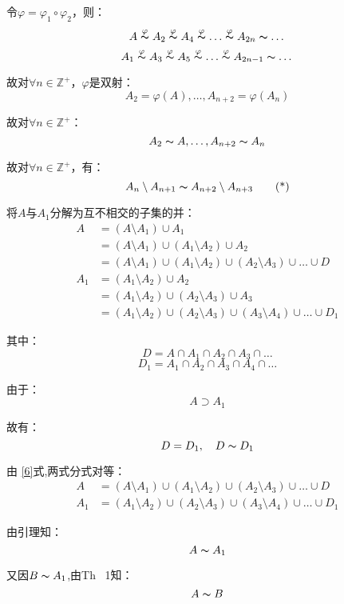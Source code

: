 \par 令$\varphi =\varphi _{1}\circ \varphi _{2}$，则：
$$A \stackrel{\varphi}{\thicksim }A_{2}\stackrel{\varphi}{\thicksim }A_{4}\stackrel{\varphi}{\thicksim } \dots \stackrel{\varphi}{\thicksim}A_{2n} \thicksim \dots$$
$$A_{1} \stackrel{\varphi}{\thicksim }A_{3}\stackrel{\varphi}{\thicksim }A_{5}\stackrel{\varphi}{\thicksim } \dots \stackrel{\varphi}{\thicksim}A_{2n-1} \thicksim \dots$$
\par 故对$\forall n \in \mathbb{Z}^{+}$，$\varphi $是双射：
$$A_{2} = \varphi (A),\dots,A_{n+2} = \varphi (A_{n})$$
\par 故对$\forall n \in \mathbb{Z}^{+}$：
$$A_{2}\thicksim A,\dots,A_{n+2}\thicksim A_{n}$$
\par 故对$\forall n \in \mathbb{Z}^{+}$，有：
\begin{equation}
   A_{n}\setminus A_{n+1}\thicksim A_{n+2}\setminus A_{n+3} \tag{*} \label{6}
\end{equation}
\par 将$A$与$A_{1}$分解为互不相交的子集的并：
\begin{align*}
    A & = \left(A\setminus A_{1}\right) \cup A_{1} \\
    & = \left(A\setminus A_{1}\right) \cup \left(A_{1}\setminus A_{2}\right) \cup A_{2}\\
    & = \left(A\setminus A_{1}\right) \cup \left(A_{1}\setminus A_{2}\right) \cup \left(A_{2}\setminus A_{3}\right) \cup \dots \cup D\\
    A_{1} & = \left(A_{1}\setminus A_{2}\right) \cup A_{2} \\
    & = \left(A_{1}\setminus A_{2}\right) \cup \left(A_{2}\setminus A_{3}\right) \cup A_{3}\\
    & = \left(A_{1}\setminus A_{2}\right) \cup \left(A_{2}\setminus A_{3}\right) \cup \left(A_{3}\setminus A_{4}\right) \cup \dots \cup D_{1}
\end{align*}
\par 其中：
$$D = A\cap A_{1} \cap A_{2} \cap A_{3} \cap \dots$$
$$D_{1} = A_{1} \cap A_{2} \cap A_{3} \cap A_{4} \cap \dots$$
\par 由于：
$$A\supset A_{1}$$
\par 故有：
$$D = D_{1},\quad D\thicksim D_{1}$$
\par 由 \eqref{6}式,两式分式对等：
\begin{align*}
    A & =\left(A\setminus A_{1}\right) \cup \left(A_{1}\setminus A_{2}\right) \cup \left(A_{2}\setminus A_{3}\right) \cup \dots \cup D\\
    A_{1} & =\left(A_{1}\setminus A_{2}\right) \cup \left(A_{2}\setminus A_{3}\right) \cup \left(A_{3}\setminus A_{4}\right) \cup \dots \cup D_{1}
\end{align*}
\par 由引理知：
$$A \thicksim A_{1}$$
\par 又因$B\thicksim A_{1}$,由Th \ 1知：
$$A\thicksim B$$

